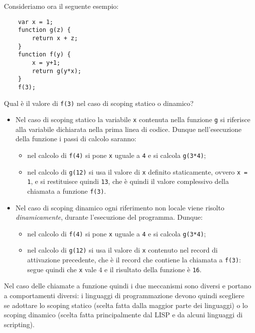 Consideriamo ora il seguente esempio:
\begin{verbatim}
    var x = 1;
    function g(z) {
        return x + z;
    }
    function f(y) {
        x = y+1;
        return g(y*x);
    }
    f(3);
\end{verbatim}
Qual è il valore di \texttt{f(3)} nel caso di scoping statico o dinamico?
\begin{itemize}
    \item Nel caso di scoping statico la variabile \texttt{x} contenuta nella funzione \texttt{g} si riferisce alla variabile dichiarata nella prima linea di codice. Dunque nell'esecuzione della funzione i passi di calcolo saranno:
    \begin{itemize}
        \item nel calcolo di \texttt{f(4)} si pone \texttt{x} uguale a \texttt{4} e si calcola \texttt{g(3*4)};
        \item nel calcolo di \texttt{g(12)} si usa il valore di \texttt{x} definito staticamente, ovvero \texttt{x = 1}, e si restituisce quindi \texttt{13}, che è quindi il valore complessivo della chiamata a funzione \texttt{f(3)}.
    \end{itemize}
    \item Nel caso di scoping dinamico ogni riferimento non locale viene risolto \emph{dinamicamente}, durante l'esecuzione del programma. Dunque: \begin{itemize}
        \item nel calcolo di \texttt{f(4)} si pone \texttt{x} uguale a \texttt{4} e si calcola \texttt{g(3*4)};
        \item nel calcolo di \texttt{g(12)} si usa il valore di \texttt{x} contenuto nel record di attivazione precedente, che è il record che contiene la chiamata a \texttt{f(3)}: segue quindi che \texttt{x} vale $4$ e il risultato della funzione è \texttt{16}.
    \end{itemize}
\end{itemize}

Nel caso delle chiamate a funzione quindi i due meccanismi sono diversi e portano a comportamenti diversi: i linguaggi di programmazione devono quindi scegliere se adottare lo scoping statico (scelta fatta dalla maggior parte dei linguaggi) o lo scoping dinamico (scelta fatta principalmente dal LISP e da alcuni linguaggi di scripting).

